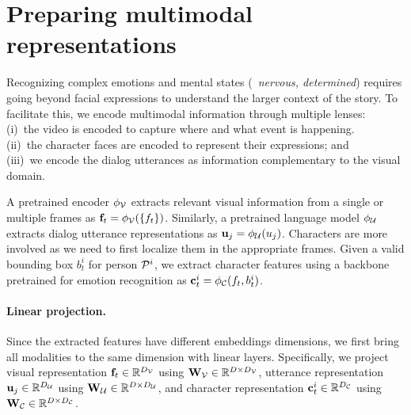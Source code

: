 \section{Preparing multimodal representations}
\label{sec:backbones}
Recognizing complex emotions and mental states (\eg~\emph{nervous, determined}) requires going beyond facial expressions to understand the larger context of the story.
To facilitate this, we encode multimodal information through multiple lenses: \\
(i)~the video is encoded to capture where and what event is happening. \\
(ii)~the character faces are encoded to represent their expressions; and \\
(iii)~we encode the dialog utterances as information complementary to the visual domain.

A pretrained encoder $\phi_{\mathcal{V}}$ extracts relevant visual information from a single or multiple frames as $\mathbf{f}_t = \phi_{\mathcal{V}}(\{f_t\})$.
Similarly, a pretrained language model $\phi_{\mathcal{U}}$ extracts dialog utterance representations as $\mathbf{u}_j = \phi_{\mathcal{U}}(u_j)$.
Characters are more involved as we need to first localize them in the appropriate frames.
Given a valid bounding box $b_t^i$ for person $\mathcal{P}^i$, we extract character features using a backbone pretrained for emotion recognition as $\mathbf{c}_t^i = \phi_{\mathcal{C}}(f_t, b_t^i)$.

\paragraph{Linear projection.}
Since the extracted features have different embeddings dimensions, we first bring all modalities to the same dimension with linear layers.
Specifically, we project visual representation
$\mathbf{f}_t \in \mathbb{R}^{D_{\mathcal{V}}}$ using $\mathbf{W}_{\mathcal{V}} \in \mathbb{R}^{D \times D_{\mathcal{V}}}$,
utterance representation $\mathbf{u}_j \in \mathbb{R}^{D_{\mathcal{U}}}$ using $\mathbf{W}_{\mathcal{U}} \in \mathbb{R}^{D \times D_{\mathcal{U}}}$, and
character representation $\mathbf{c}_t^i \in \mathbb{R}^{D_{\mathcal{C}}}$ using $\mathbf{W}_{\mathcal{C}} \in \mathbb{R}^{D \times D_{\mathcal{C}}}$.
